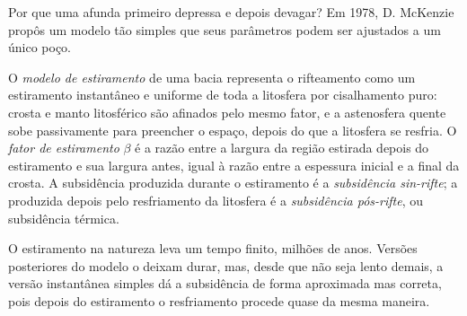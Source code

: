Por que uma  afunda primeiro depressa e depois devagar? Em 1978, D. McKenzie propôs um modelo tão
simples que seus parâmetros podem ser ajustados a um único poço.

\begin{definition}\label{def:b2:basins-compared:stretching}
O \emph{modelo de estiramento} de uma bacia representa o rifteamento como um
estiramento instantâneo e uniforme de toda a litosfera por cisalhamento puro: crosta e manto
litosférico são afinados pelo mesmo fator, e a astenosfera quente sobe passivamente para preencher o
espaço, depois do que a litosfera se resfria. O \emph{fator de estiramento}
$\beta$ é a razão entre a largura da região estirada depois do estiramento e sua largura antes,
igual à razão entre a espessura inicial e a final da crosta. A subsidência produzida
durante o estiramento é a \emph{subsidência sin-rifte}; a produzida
depois pelo resfriamento da litosfera é a \emph{subsidência
pós-rifte}, ou subsidência térmica.
\end{definition}

O estiramento na natureza leva um tempo finito, milhões de anos. Versões posteriores do modelo o deixam
durar, mas, desde que não seja lento demais, a versão instantânea simples dá a subsidência
de forma aproximada mas correta, pois depois do estiramento o resfriamento procede quase da mesma maneira.

